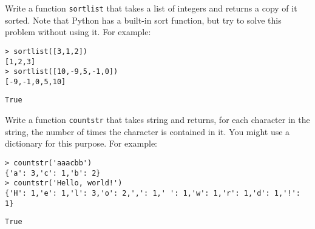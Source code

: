 \documentclass[a4paper, 12pt]{exam}
\begin{document}
\begin{questions}
\question
Write a function \texttt{sortlist} that takes a list of integers and returns a copy of it sorted.
Note that Python has a built-in sort function, but try to solve this problem without using it.
For example:
\begin{verbatim}
> sortlist([3,1,2])
[1,2,3]
> sortlist([10,-9,5,-1,0])
[-9,-1,0,5,10]
\end{verbatim}

\begin{solution}
  \begin{verbatim}
True
  \end{verbatim}
\end{solution}


\question
Write a function \texttt{countstr} that takes string and returns, for each character in the string, the number of times the character is contained in it.
You might use a dictionary for this purpose.
For example:
\begin{verbatim}
> countstr('aaacbb')
{'a': 3,'c': 1,'b': 2}
> countstr('Hello, world!')
{'H': 1,'e': 1,'l': 3,'o': 2,',': 1,' ': 1,'w': 1,'r': 1,'d': 1,'!': 1}
\end{verbatim}

\begin{solution}
  \begin{verbatim}
True
  \end{verbatim}
\end{solution}


\end{questions}



\end{document}
